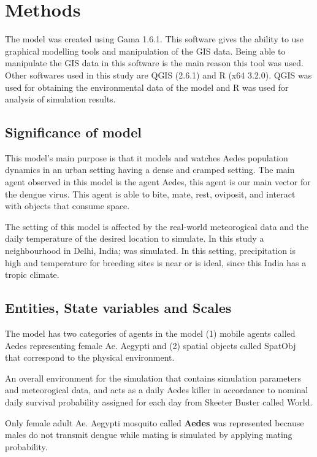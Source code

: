 \section{Methods}

The model was created using Gama 1.6.1. This software gives the ability to use graphical modelling tools and manipulation of the GIS data. Being able to manipulate the GIS data in this software is the main reason this tool was used. Other softwares used in this study are QGIS (2.6.1) and R (x64 3.2.0). QGIS was used for obtaining the environmental data of the model and R was used for analysis of simulation results.


\subsection{Significance of model}
This model's main purpose is that it models and watches Aedes population dynamics in an urban setting having a dense and cramped setting. The main agent observed in this model is the agent Aedes, this agent is our main vector for the dengue virus. This agent is able to bite, mate, rest, oviposit, and interact with objects that consume space. 

The setting of this model is affected by the real-world meteorogical data and the daily temperature of the desired location to simulate. In this study a neighbourhood in Delhi, India; was simulated. In this setting, precipitation is high and temperature for breeding sites is near or is ideal, since this India has a tropic climate.

\subsection{Entities, State variables and Scales}

The model has two categories of agents in the model (1) mobile agents called Aedes representing female Ae. Aegypti and (2) spatial objects called SpatObj that correspond to the physical environment. 

An overall environment for the simulation that contains simulation parameters and meteorogical data, and acts as a daily Aedes killer in accordance to nominal daily survival probability assigned for each day \cite{magori}  from Skeeter Buster called World.

Only female adult Ae. Aegypti mosquito called \textbf{Aedes} was represented because males do not transmit dengue while mating is simulated by applying mating probability. 

